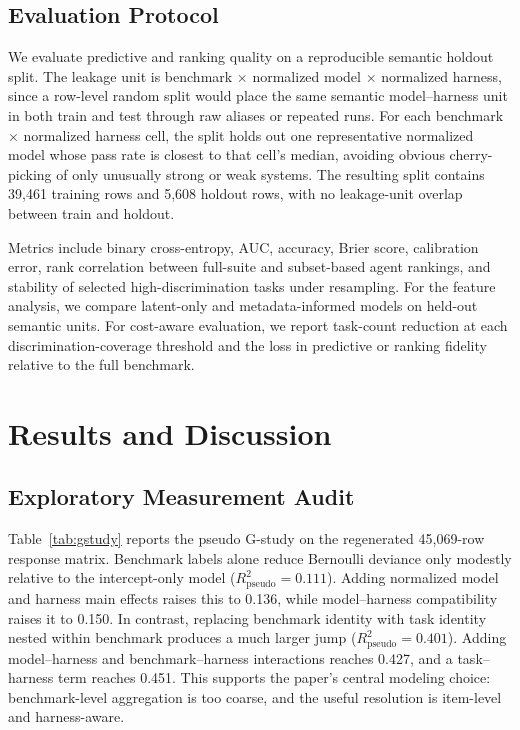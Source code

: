 \documentclass{article}
\begin{document}
\subsection{Evaluation Protocol}

We evaluate predictive and ranking quality on a reproducible semantic holdout split. The leakage unit is benchmark $\times$ normalized model $\times$ normalized harness, since a row-level random split would place the same semantic model--harness unit in both train and test through raw aliases or repeated runs. For each benchmark $\times$ normalized harness cell, the split holds out one representative normalized model whose pass rate is closest to that cell's median, avoiding obvious cherry-picking of only unusually strong or weak systems. The resulting split contains 39{,}461 training rows and 5{,}608 holdout rows, with no leakage-unit overlap between train and holdout.

Metrics include binary cross-entropy, AUC, accuracy, Brier score, calibration error, rank correlation between full-suite and subset-based agent rankings, and stability of selected high-discrimination tasks under resampling. For the feature analysis, we compare latent-only and metadata-informed models on held-out semantic units. For cost-aware evaluation, we report task-count reduction at each discrimination-coverage threshold and the loss in predictive or ranking fidelity relative to the full benchmark.

\section{Results and Discussion}

\subsection{Exploratory Measurement Audit}

Table~\ref{tab:gstudy} reports the pseudo G-study on the regenerated 45{,}069-row response matrix. Benchmark labels alone reduce Bernoulli deviance only modestly relative to the intercept-only model ($R^2_{\mathrm{pseudo}}=0.111$). Adding normalized model and harness main effects raises this to 0.136, while model--harness compatibility raises it to 0.150. In contrast, replacing benchmark identity with task identity nested within benchmark produces a much larger jump ($R^2_{\mathrm{pseudo}}=0.401$). Adding model--harness and benchmark--harness interactions reaches 0.427, and a task--harness term reaches 0.451. This supports the paper's central modeling choice: benchmark-level aggregation is too coarse, and the useful resolution is item-level and harness-aware.
\end{document}
